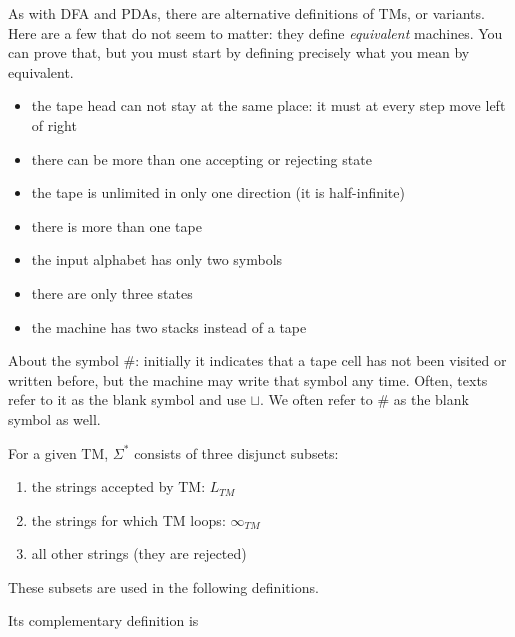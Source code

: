 As with DFA and PDAs, there are alternative definitions of TMs, or
variants. Here are a few that do not seem to matter: they define {\em
  equivalent} machines. You can prove that, but you must start by
defining precisely what you mean by equivalent.

\begin{itemize}
\item the tape head can not stay at the same place: it must at every step move left of right
\item there can be more than one accepting or rejecting state
\item the tape is unlimited in only one direction (it is half-infinite)
\item there is more than one tape
\item the input alphabet has only two symbols\label{twosymbols}
\item there are only three states
\item the machine has two stacks instead of a tape
\end{itemize}

About the symbol \#: initially it indicates that a tape cell has not
been visited or written before, but the machine may write that symbol
any time. Often, texts refer to it as the blank symbol and use
$\sqcup$. We often refer to \# as the blank symbol as well.


For a given TM, $\Sigma^*$ consists of three disjunct subsets:
\begin{enumerate}
\item the strings accepted by TM: $L_{TM}$
\item the strings for which TM loops: $\infty_{TM}$
\item all other strings (they are rejected)
\end{enumerate}
These subsets are used in the following definitions.


Its complementary definition is



